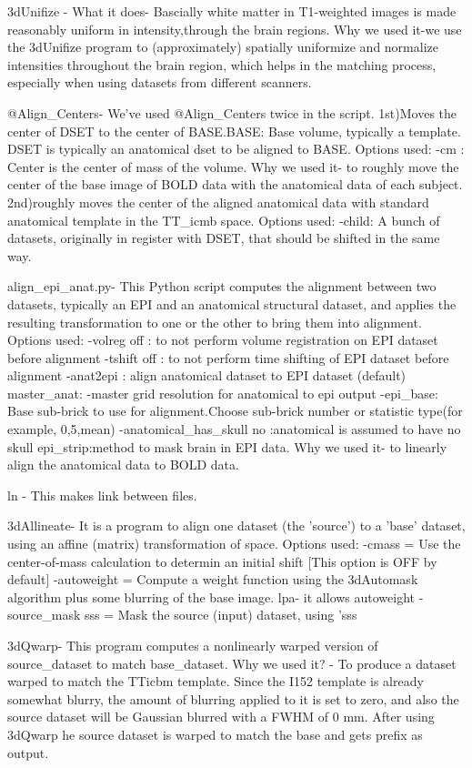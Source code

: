 \documentclass[12pt]{article}
\begin{document}
\iffalse
3dUnifize - What it does- Bascially white matter in T1-weighted images
is made reasonably uniform in intensity,through the brain regions.
Why we used it-we use the 3dUnifize program to (approximately)
spatially uniformize and normalize intensities throughout the brain
region, which helps in the matching process, especially when using
datasets from different scanners.

@Align\_Centers- We've used @Align\_Centers twice in the script.
1st)Moves the center of DSET to the center of BASE.BASE: Base volume,
typically a template. DSET is typically an anatomical dset to be
aligned to BASE. Options used: -cm : Center is the center of mass of
the volume. Why we used it- to roughly move the center of the base
image of BOLD data with the anatomical data of each subject.
2nd)roughly moves the center of the aligned anatomical data with
standard anatomical template in the TT\_icmb space. Options used:
-child: A bunch of datasets, originally in register with DSET, that
should be shifted in the same way.

align\_epi\_anat.py- This Python script computes the alignment between
two datasets, typically an EPI and an anatomical structural dataset,
and applies the resulting transformation to one or the other to bring
them into alignment. Options used: -volreg off : to not perform
volume registration on EPI dataset before alignment -tshift off : to
not perform time shifting of EPI dataset before alignment -anat2epi :
align anatomical dataset to EPI dataset (default) master\_anat:
-master grid resolution for anatomical to epi output -epi\_base: Base
sub-brick to use for alignment.Choose sub-brick number or statistic
type(for example, 0,5,mean) -anatomical\_has\_skull no :anatomical is
assumed to have no skull epi\_strip:method to mask brain in EPI data.
Why we used it- to linearly align the anatomical data to BOLD data.

ln - This makes link between files.

3dAllineate- It is a program to align one dataset (the 'source') to a
'base' dataset, using an affine (matrix) transformation of space.
Options used: -cmass = Use the center-of-mass calculation to determin
an initial shift [This option is OFF by default] -autoweight = Compute
a weight function using the 3dAutomask algorithm plus some blurring of
the base image. lpa- it allows autoweight -source\_mask sss = Mask
the source (input) dataset, using 'sss


3dQwarp- This program computes a nonlinearly warped version of
source\_dataset to match base\_dataset. Why we used it? - To produce
a dataset warped to match the TTicbm template. Since the I152 template
is already somewhat blurry, the amount of blurring applied to it is
set to zero, and also the source dataset will be Gaussian blurred with
a FWHM of 0 mm. After using 3dQwarp he source dataset is warped to
match the base and gets prefix as output.
\end{document}
